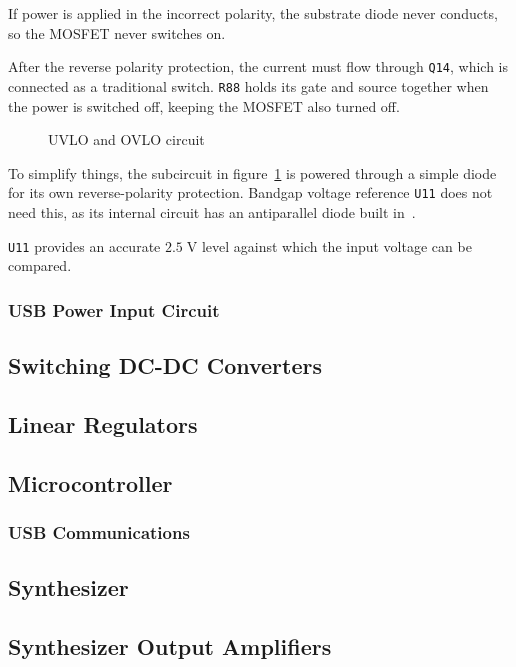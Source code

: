 \documentclass{article}
\newcommand{\refdes}[1]{\texttt{#1}}
\newcommand{\mr}[1]{\ensuremath{\mathrm{#1}}}
\begin{document}
If power is applied in the incorrect polarity, the substrate diode never
conducts, so the MOSFET never switches on.

After the reverse polarity protection, the current must flow through
\refdes{Q14}, which is connected as a traditional switch. \refdes{R88} holds
its gate and source together when the power is switched off, keeping the MOSFET
also turned off.

\begin{figure}[h]
\centering
{}
\caption{UVLO and OVLO circuit}
\label{fig:uovlo}
\end{figure}

To simplify things, the subcircuit in figure~\ref{fig:uovlo} is powered through
a simple diode for its own reverse-polarity protection. Bandgap voltage reference
\refdes{U11} does not need this, as its internal circuit has an antiparallel diode
built in~\cite{tl431}.

\refdes{U11} provides an accurate $2.5\;\mr{V}$ level against which the input
voltage can be compared.

\subsubsection{USB Power Input Circuit}

\subsection{Switching DC-DC Converters}

\subsection{Linear Regulators}

\subsection{Microcontroller}
\subsubsection{USB Communications}

\subsection{Synthesizer}

\subsection{Synthesizer Output Amplifiers}
\end{document}
